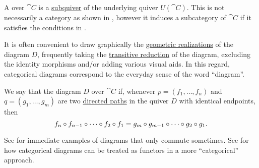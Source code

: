 \begin{definition}\label{def:categorical_diagram}
  A  over \( \cat{C} \) is a \hyperref[eq:def:hypergraph/submodel/full]{subquiver} of the underlying quiver \( U(\cat{C}) \). This is not necessarily a category as shown in , however it induces a subcategory of \( \cat{C} \) if it satisfies the conditions in .

  It is often convenient to draw graphically the \hyperref[def:quiver_geometric_realization]{geometric realizations} of the diagram \( D \), frequently taking the \hyperref[def:quiver_transitive_closure]{transitive reduction} of the diagram, excluding the identity morphisms and/or adding various visual aids. In this regard, categorical diagrams correspond to the everyday sense of the word \enquote{diagram}.

  We say that the diagram \( D \) over \( \cat{C} \)  if, whenever \( p = (f_1, \ldots, f_n) \) and \( q = (g_1, \ldots, g_m) \) are two \hyperref[def:quiver_path/directed]{directed paths} in the quiver \( D \) with identical endpoints, then
  \begin{equation*}
    f_n \bincirc f_{n-1} \bincirc \cdots \bincirc f_2 \bincirc f_1
    =
    g_m \bincirc g_{m-1} \bincirc \cdots \bincirc g_2 \bincirc g_1.
  \end{equation*}

  See  for immediate examples of diagrams that only commute sometimes. See  for how categorical diagrams can be treated as functors in a more \enquote{categorical} approach.
\end{definition}

